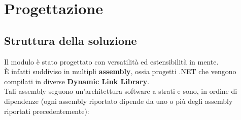\documentclass[\main/tesi.tex]{subfiles}
\begin{document}
\chapter{Progettazione}

\section{Struttura della soluzione}
Il modulo è stato progettato con versatilità ed estensibilità in mente.\\
È infatti suddiviso in multipli \textbf{assembly}, ossia progetti .NET che vengono compilati in diverse \textbf{Dynamic Link Library}.\\

Tali assembly seguono un'architettura software a strati e sono, in ordine di dipendenze (ogni assembly riportato dipende da uno o più degli assembly riportati precedentemente):
\end{document}
